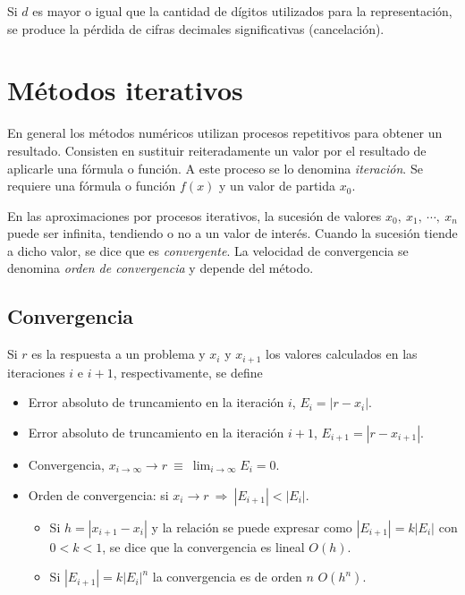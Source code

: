 \documentclass{article}
\begin{document}
Si $d$ es mayor o igual que la cantidad de dígitos utilizados para la 
representación, se produce la pérdida de cifras decimales significativas 
(cancelación).

\section{Métodos iterativos}

En general los métodos numéricos utilizan procesos repetitivos para obtener un 
resultado. Consisten en sustituir reiteradamente un valor por el resultado 
de aplicarle una fórmula o función. A este proceso se lo denomina 
\textit{iteración}. Se requiere una fórmula o función $f(x)$ y un valor de 
partida $x_0$.

En las aproximaciones por procesos iterativos, la sucesión de valores 
$x_0,\ x_1,\ \cdots,\ x_n$ puede ser infinita, tendiendo o no a un valor de
interés. Cuando la sucesión tiende a dicho valor, se dice que es 
\textit{convergente}. La velocidad de convergencia se denomina 
\textit{orden de convergencia} y depende del método.

\subsection{Convergencia}

Si $r$ es la respuesta a un problema y $x_i$ y $x_{i+1}$ los valores calculados
en las iteraciones $i$ e $i+1$, respectivamente, se define

\begin{itemize}
    \item Error absoluto de truncamiento en la iteración $i$, $E_i = |r-x_i|$.
    \item Error absoluto de truncamiento en la iteración $i+1$, 
        $E_{i+1} = |r-x_{i+1}|$.
    \item Convergencia, $x_{i\to\infty}\to r\ \equiv\ \lim_{i\to\infty}E_i=0$.
    \item Orden de convergencia: si $x_i\to r\ \Rightarrow\ |E_{i+1}|<|E_i|$.
    \begin{itemize}
        \item Si $h = |x_{i+1} - x_{i}|$ y la relación se puede expresar como
            $|E_{i+1}| = k|E_i|$ con $0<k<1$, se dice que la convergencia es
            lineal $O(h)$.
        \item Si $|E_{i+1}| = k|E_i|^n$ la convergencia es de orden $n$ $O(h^n)$.
    \end{itemize}
\end{itemize}
\end{document}

